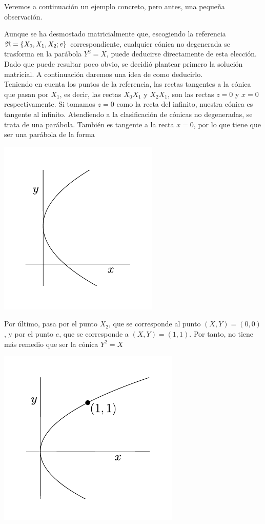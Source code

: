 Veremos a continuación un ejemplo concreto, pero antes, una pequeña observación.
\begin{obs}
	Aunque se ha desmostado matricialmente que, escogiendo la referencia $\mathfrak{R}=\{X_0,X_1,X_2;e\}$ correspondiente, cualquier cónica no degenerada se trasforma en la parábola $Y^2=X$, puede deducirse directamente de esta elección. Dado que puede resultar poco obvio, se decidió plantear primero la solución matricial. A continuación daremos una idea de como deducirlo.\\
	
	Teniendo en cuenta los puntos de la referencia, las rectas tangentes a la cónica que pasan por $X_1$, es decir, las rectas $X_0X_1$ y $X_2X_1$, son las rectas $z=0$ y $x=0$ respectivamente. Si tomamos $z=0$ como la recta del infinito, nuestra cónica es tangente al infinito. Atendiendo a la clasificación de cónicas no degeneradas, se trata de una parábola. También es tangente a la recta $x=0$, por lo que tiene que ser una parábola de la forma
	\begin{center}
		\includegraphics[scale=.6]{Graficos/Conicas/Parabola2}
	\end{center}
	Por último, pasa por el punto $X_2$, que se corresponde al punto $(X,Y)=(0,0)$, y por el punto $e$, que se corresponde a $(X,Y)=(1,1)$. Por tanto, no tiene más remedio que ser la cónica $Y^2=X$
	\begin{center}
		\includegraphics[scale=.6]{Graficos/Conicas/Parabola3}
	\end{center}
\end{obs}
